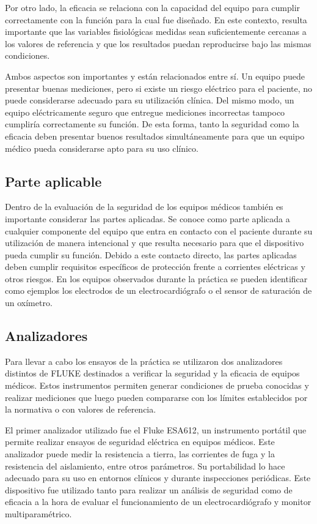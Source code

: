 Por otro lado, la eficacia se relaciona con la capacidad del equipo para cumplir correctamente con la función para la
 cual fue diseñado. En este contexto, resulta importante que las variables fisiológicas medidas sean suficientemente 
cercanas a los valores de referencia y que los resultados puedan reproducirse bajo las mismas condiciones.

Ambos aspectos son importantes y están relacionados entre sí. Un equipo puede presentar buenas mediciones,
 pero si existe un riesgo eléctrico para el paciente, no puede considerarse adecuado para su utilización clínica. 
 Del mismo modo, un equipo eléctricamente seguro que entregue mediciones incorrectas tampoco cumpliría correctamente
 su función. De esta forma, tanto la seguridad como la eficacia deben presentar buenos resultados simultáneamente para 
 que un equipo médico pueda considerarse apto para su uso clínico.

\subsection{Parte aplicable}
Dentro de la evaluación de la seguridad de los equipos médicos también es importante considerar las partes aplicadas.
Se conoce como parte aplicada a cualquier componente del equipo que entra en contacto con el paciente durante su utilización 
de manera intencional y que resulta necesario para que el dispositivo pueda cumplir su función. Debido a este contacto directo, 
las partes aplicadas deben cumplir requisitos específicos de protección frente a corrientes eléctricas y otros riesgos.
 En los equipos observados durante la práctica se pueden identificar como ejemplos los electrodos de un electrocardiógrafo
 o el sensor de saturación de un oxímetro.

\subsection{Analizadores}
Para llevar a cabo los ensayos de la práctica se utilizaron dos analizadores distintos de FLUKE destinados a verificar 
la seguridad y la eficacia de equipos médicos. Estos instrumentos permiten generar condiciones de prueba conocidas y
 realizar mediciones que luego pueden compararse con los límites establecidos por la normativa o con valores de referencia.

El primer analizador utilizado fue el Fluke ESA612, un instrumento portátil que permite realizar ensayos de seguridad eléctrica
 en equipos médicos. Este analizador puede medir la resistencia a tierra, las corrientes de fuga y la resistencia del aislamiento,
 entre otros parámetros. Su portabilidad lo hace adecuado para su uso en entornos clínicos y durante inspecciones periódicas. 
Este dispositivo fue utilizado tanto para realizar un análisis de seguridad como de eficacia a la hora de evaluar el funcionamiento 
de un electrocardiógrafo y monitor multiparamétrico.

